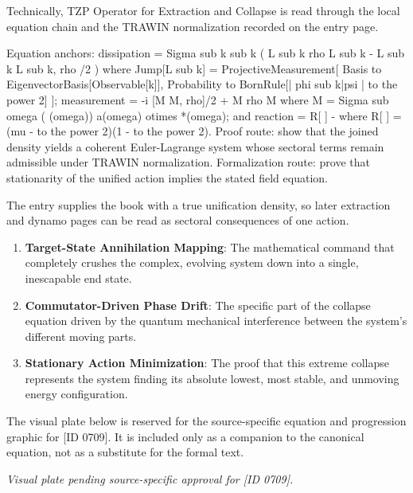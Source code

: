 Technically, TZP Operator for Extraction and Collapse is read through the local equation chain and the TRAWIN normalization recorded on the entry page.

Equation anchors: dissipation = Sigma sub k   sub k ( L sub k rho L sub k  - L sub k  L sub k, rho /2 ) where Jump[L sub k] = ProjectiveMeasurement[ Basis to EigenvectorBasis[Observable[k]], Probability to BornRule[| phi sub k|psi | to the power 2] ]; measurement = -i [M M, rho]/2 + M rho M  where M = Sigma sub omega  ( (omega)) a(omega) otimes  *(omega); and reaction = R[ ] -   where R[ ] =  (mu -   to the power 2)(1 -   to the power 2). Proof route: show that the joined density yields a coherent Euler-Lagrange system whose sectoral terms remain admissible under TRAWIN normalization. Formalization route: prove that stationarity of the unified action implies the stated field equation.

The entry supplies the book with a true unification density, so later extraction and dynamo pages can be read as sectoral consequences of one action.
\endgroup

\begin{enumerate}[leftmargin=1.6em,itemsep=6pt,topsep=4pt]
\item \textbf{Target-State Annihilation Mapping}: The mathematical command that completely crushes the complex, evolving system down into a single, inescapable end state.
\item \textbf{Commutator-Driven Phase Drift}: The specific part of the collapse equation driven by the quantum mechanical interference between the system's different moving parts.
\item \textbf{Stationary Action Minimization}: The proof that this extreme collapse represents the system finding its absolute lowest, most stable, and unmoving energy configuration.
\end{enumerate}

\begingroup\footnotesize\sloppy
The visual plate below is reserved for the source-specific equation and progression graphic for [ID 0709]. It is included only as a companion to the canonical equation, not as a substitute for the formal text.
\par\endgroup
\begingroup\footnotesize\itshape
Visual plate pending source-specific approval for [ID 0709].
\par\endgroup

